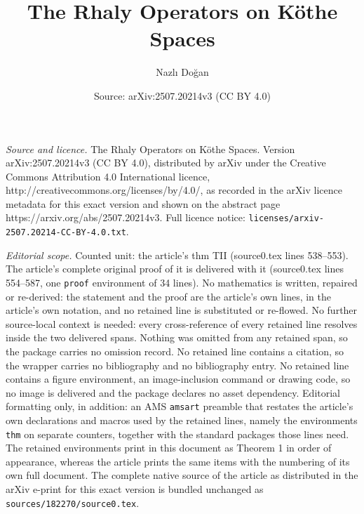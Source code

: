 \documentclass[10pt,a4paper]{amsart}
\title{The Rhaly Operators on K\"othe Spaces}
\author{Nazl{\i} Do\u{g}an}
\date{Source: arXiv:2507.20214v3 (CC BY 4.0)}
\begin{document}
\maketitle

\noindent\emph{Source and licence.} The Rhaly Operators on K\"othe Spaces. Version arXiv:2507.20214v3 (CC BY 4.0), distributed by arXiv under the Creative Commons Attribution 4.0 International licence, http://creativecommons.org/licenses/by/4.0/, as recorded in the arXiv licence metadata for this exact version and shown on the abstract page https://arxiv.org/abs/2507.20214v3. Full licence notice: \texttt{licenses/arxiv-2507.20214-CC-BY-4.0.txt}.\par\smallskip

\noindent\textit{Editorial scope.} Counted unit: the article's thm TII (source0.tex lines 538--553). The article's complete original proof of it is delivered with it (source0.tex lines 554--587, one \texttt{proof} environment of 34 lines). No mathematics is written, repaired or re-derived: the statement and the proof are the article's own lines, in the article's own notation, and no retained line is substituted or re-flowed.  No further source-local context is needed: every cross-reference of every retained line resolves inside the two delivered spans.  Nothing was omitted from any retained span, so the package carries no omission record.  No retained line contains a citation, so the wrapper carries no bibliography and no bibliography entry.  No retained line contains a figure environment, an image-inclusion command or drawing code, so no image is delivered and the package declares no asset dependency.  Editorial formatting only, in addition: an AMS \texttt{amsart} preamble that restates the article's own declarations and macros used by the retained lines, namely the environments \texttt{thm} on separate counters, together with the standard packages those lines need.  The retained environments print in this document as Theorem 1 in order of appearance, whereas the article prints the same items with the numbering of its own full document.  The complete native source of the article as distributed in the arXiv e-print for this exact version is bundled unchanged as \texttt{sources/182270/source0.tex}.
\end{document}
